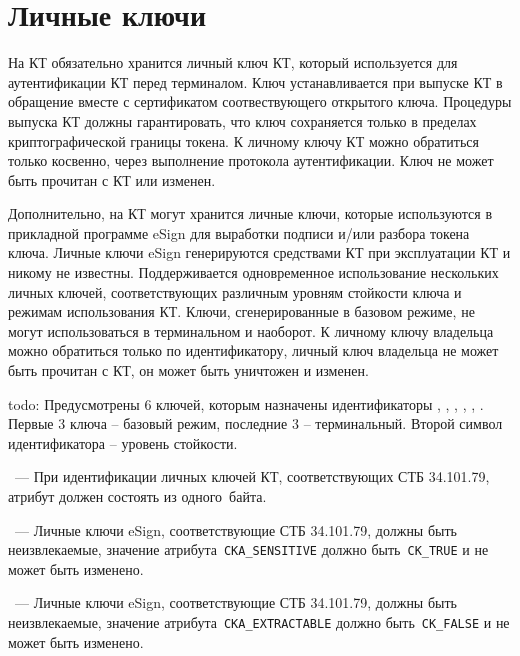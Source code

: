 \section{Личные ключи}\label{OBJ.Keys}

На КТ обязательно хранится личный ключ КТ, который используется 
для аутентификации КТ перед терминалом. Ключ устанавливается при выпуске
КТ в обращение вместе с сертификатом соотвествующего открытого ключа. 
Процедуры выпуска КТ должны гарантировать, что ключ сохраняется только в 
пределах криптографической границы токена. К личному ключу КТ можно обратиться 
только косвенно, через выполнение протокола аутентификации. Ключ не может быть 
прочитан с КТ или изменен. 

Дополнительно, на КТ могут хранится личные ключи, 
которые используются в прикладной программе eSign для выработки 
подписи и/или разбора токена ключа.
Личные ключи eSign генерируются средствами КТ при эксплуатации
КТ и никому не известны. 
Поддерживается одновременное использование нескольких личных ключей, 
соответствующих различным уровням стойкости ключа и режимам
использования КТ.
Ключи, сгенерированные в базовом режиме, не могут использоваться 
в терминальном и наоборот.
К личному ключу владельца можно обратиться только по идентификатору, 
личный ключ владельца не может быть прочитан с КТ, 
он может быть уничтожен и изменен.

todo: 
Предусмотрены 6 ключей, которым назначены идентификаторы 
, , , , , .
Первые 3 ключа -- базовый режим, последние 3 -- терминальный.
Второй символ идентификатора -- уровень стойкости.

\begin{note}
~---
При идентификации личных ключей КТ, соответствующих СТБ 34.101.79,
атрибут должен состоять из одного~байта.
\end{note}

\begin{note}
~---
Личные ключи eSign, соответствующие СТБ 34.101.79, должны быть неизвлекаемые,
значение атрибута~\verb|CKA_SENSITIVE| должно быть~\verb|CK_TRUE| и
не может быть изменено.
\end{note}

\begin{note}
~---
Личные ключи eSign, соответствующие СТБ 34.101.79, должны быть неизвлекаемые,
значение атрибута~\verb|CKA_EXTRACTABLE| должно быть~\verb|CK_FALSE| и
не может быть изменено.
\end{note}

